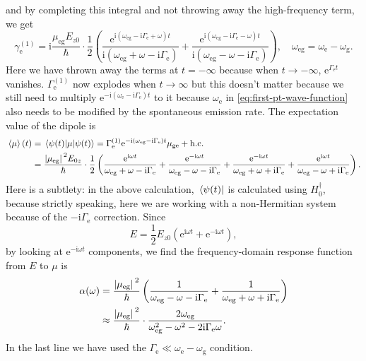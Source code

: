 \documentclass[hyperref, a4paper]{article}
\newcommand*{\ii}{\mathrm{i}}
\newcommand*{\ee}{\mathrm{e}}
\newcommand*{\Gammae}{\Gamma_{\text{e}}}
\newcommand*{\omegae}{\omega_{\text{e}}}
\newcommand*{\omegag}{\omega_{\text{g}}}
\newcommand*{\omegaeg}{\omega_{\text{eg}}}
\begin{document}
and by completing this integral 
and not throwing away the high-frequency term, 
we get 
\begin{equation}
    \gamma^{(1)}_{\text{e}} = \ii \frac{\mu_{\text{eg}} E_{z0}}{\hbar} 
    \cdot \frac{1}{2} \left(
        \frac{\ee^{\ii (\omegaeg - \ii \Gammae + \omega) t}}{
            \ii (\omegaeg + \omega - \ii \Gammae)
        } + 
        \frac{\ee^{\ii (\omegaeg - \ii \Gammae - \omega) t}}{
            \ii (\omegaeg - \omega - \ii \Gammae)
        }
    \right), \quad 
    \omegaeg = \omegae - \omegag.
\end{equation}
Here we have thrown away the terms at $t = - \infty$ 
because when $t \to -\infty$, $\ee^{\Gammae t}$ vanishes.
$\Gammae^{(1)}$ now explodes when $t \to \infty$
but this doesn't matter because we still need to multiply 
$\ee^{- \ii (\omegae - \ii \Gammae) t}$ to it
because $\omegae$ in \eqref{eq:first-pt-wave-function}
also needs to be modified by the spontaneous emission rate.
The expectation value of the dipole is 
\begin{equation}
    \begin{aligned}
        \expval*{\mu}(t) &= \expval*{\mu}{\psi(t)}
        = \Gammae^{(1)}
        \ee^{- \ii (\omegaeg - \ii \Gammae) t} \mu_{\text{ge}} + \text{h.c.} \\ 
        &= \frac{\abs*{\mu_{\text{eg}}}^2 E_{0z}}{\hbar} \cdot \frac{1}{2} \left(
            \frac{\ee^{\ii \omega t}}{\omegaeg + \omega - \ii \Gammae}
            + \frac{\ee^{- \ii \omega t}}{\omegaeg - \omega - \ii \Gammae}
            + \frac{\ee^{- \ii \omega t}}{\omegaeg + \omega + \ii \Gammae}
            + \frac{\ee^{\ii \omega t}}{\omegaeg - \omega + \ii \Gammae}
        \right).
    \end{aligned}
\end{equation}
Here is a subtlety: in the above calculation, $\bra*{\psi(t)}$ is calculated using $H_0^\dagger$,
because strictly speaking, here we are working with a non-Hermitian system 
because of the $- \ii \Gammae$ correction.
Since 
\begin{equation}
    E = \frac{1}{2} E_{z0} (\ee^{\ii \omega t} + \ee^{- \ii \omega t}),
\end{equation}
by looking at $\ee^{- \ii \omega t}$ components,
we find the frequency-domain response function from $E$ to $\mu$ is 
\begin{equation}
    \begin{aligned}
        \alpha(\omega) &= \frac{\abs*{\mu_{\text{eg}}}^2}{\hbar} \left(
            \frac{1}{\omegaeg - \omega - \ii \Gammae}
            + \frac{1}{\omegaeg + \omega + \ii \Gammae}
        \right) \\
        &\approx \frac{\abs*{\mu_{\text{eg}}}^2}{\hbar} \cdot 
        \frac{2\omegaeg}{
            \omegaeg^2 - \omega^2 - 2 \ii \Gammae \omega
        }.
    \end{aligned} 
    \label{eq:alpha-two-level}
\end{equation}
In the last line we have used the $\Gammae \ll \omegae - \omegag$ condition.
\end{document}
